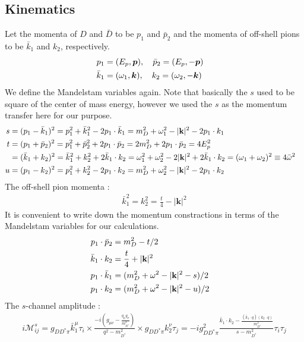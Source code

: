 \documentclass[aps,prd,preprintnumbers,showpacs,showkeys,nofootinbib,
superscriptaddress,fleqn,floatfix,tightenlines, 10pt]{revtex4-1}
\begin{document}
\subsection{Kinematics}
Let the momenta of $D$ and $\bar{D}$ to be $p_1$ and $\bar{p}_2$ and the momenta of off-shell pions
to be $\bar{k}_1$ and $k_2$, respectively.
\begin{align}
	  p_1 &= (E_p, \bm{p}), \quad \bar{p}_2 = (E_p, -\bm{p}) \cr
	  \bar{k}_1 &= (\omega_1, \bm{k}), \quad k_2 = (\omega_2, -\bm{k})
\end{align}
We define the Mandelstam variables again. Note that basically the $s$ used to be square of the center
of mass energy, however we used the $s$ as the momentum transfer here for our purpose.
\begin{align}\label{mandelstam_ddpipi}
	s &= (p_1 - \bar{k}_1)^2 = p_1^2 + \bar{k}_1^2 - 2 p_1 \cdot \bar{k}_1 = m_D^2 + \omega_1^2 - |\mathbf{k}|^2 - 2 p_1 \cdot k_1 \cr
	t &= (p_1 + \bar{p}_2)^2 = p_1^2 + \bar{p}_2^2 + 2 p_1 \cdot \bar{p}_2 = 2 m_D^2 + 2p_1 \cdot \bar{p}_2 = 4E_p^2\cr
	&= (\bar{k}_1 + k_2)^2 = \bar{k}_1^2 + k_2^2 + 2 \bar{k}_1 \cdot k_2
	= \omega_1^2 + \omega_2^2 - 2 |\mathbf{k}|^2 + 2 \bar{k}_1 \cdot k_2  = (\omega_1 + \omega_2)^2 \equiv 4 \bar{\omega}^2\cr
	u &= (p_1 - k_2)^2 = p_1^2 + k_2^2 - 2 p_1 \cdot k_2 = m_D^2 + \omega_2^2 - |\mathbf{k}|^2 - 2 p_1 \cdot k_2
\end{align}
The off-shell pion momenta :
\begin{align}
	\bar{k}_1^2 = k_2^2 = \frac{t}{4} - |\mathbf{k}|^2
\end{align}
It is convenient to write down the momentum constractions in terms of the Mandelstam variables
for our calculations.
%
\begin{align}
	p_1 \cdot \bar{p}_2 &= m_D^2 - t/2 \cr
	\bar{k}_1 \cdot k_2 &= \frac{t}{4} + |\mathbf{k}|^2 \cr
	p_1 \cdot \bar{k}_1 &= (m_D^2 + \omega^2 - |\mathbf{k}|^2 - s)/2 \cr
	p_1 \cdot k_2 &= (m_D^2 + \omega^2 - |\mathbf{k}|^2 - u)/2
\end{align}
The $s$-channel amplitude :
\begin{align}
	i\mathcal{M}_{ij}^s = g_{DD^* \pi} \bar{k}_1^\mu \tau_i \times \frac{-i\left(g_{\mu\nu} -
	\frac{q_\mu q_\nu}{m_{D^*}^2} \right)}{q^2 - m_{D^*}^2} \times g_{DD^* \pi} k_2^\nu \tau_j
	= -i g_{DD^* \pi}^2 \frac{\bar{k}_1 \cdot k_2 - \frac{(\bar{k}_1 \cdot q)(k_2 \cdot q)}
	{m_{D^*}^2}}{s - m_{D^*}^2} \tau_i \tau_j
\end{align}
\end{document}
